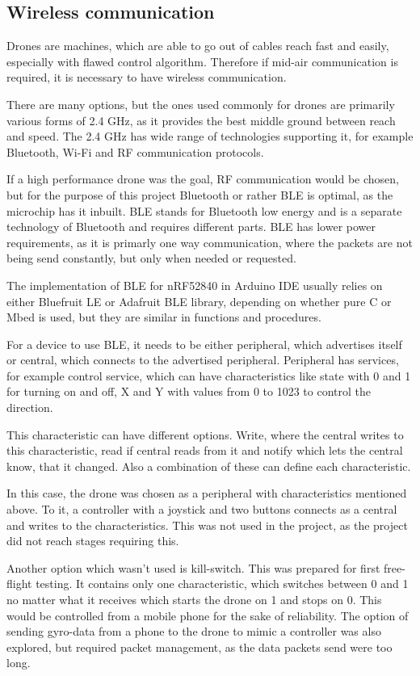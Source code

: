 \subsection{Wireless communication}
Drones are machines, which are able to go out of cables reach fast and easily, especially with flawed control algorithm. Therefore if mid-air communication is required, it is necessary to have wireless communication.

There are many options, but the ones used commonly for drones are primarily various forms of 2.4 GHz, as it provides the best middle ground between reach and speed. The 2.4 GHz has wide range of technologies supporting it, for example Bluetooth, Wi-Fi and RF communication protocols. 

If a high performance drone was the goal, RF communication would be chosen, but for the purpose of this project Bluetooth or rather BLE is optimal, as the microchip has it inbuilt. BLE stands for Bluetooth low energy and is a separate technology of Bluetooth and requires different parts. BLE has lower power requirements, as it is primarly one way communication, where the packets are not being send constantly, but only when needed or requested.

The implementation of BLE for nRF52840 in Arduino IDE usually relies on either Bluefruit LE or Adafruit BLE library, depending on whether pure C or Mbed is used, but they are similar in functions and procedures.

For a device to use BLE, it needs to be either peripheral, which advertises itself or central, which connects to the advertised peripheral. Peripheral has services, for example control service, which can have characteristics like state with 0 and 1 for turning on and off, X and Y with values from 0 to 1023 to control the direction.

This characteristic can have different options. Write, where the central writes to this characteristic, read if central reads from it and notify which lets the central know, that it changed. Also a combination of these can define each characteristic.

In this case, the drone was chosen as a peripheral with characteristics mentioned above. To it, a controller with a joystick and two buttons connects as a central and writes to the characteristics. This was not used in the project, as the project did not reach stages requiring this.

Another option which wasn't used is kill-switch. This was prepared for first free-flight testing. It contains only one characteristic, which switches between 0 and 1 no matter what it receives which starts the drone on 1 and stops on 0. This would be controlled from a mobile phone for the sake of reliability. The option of sending gyro-data from a phone to the drone to mimic a controller was also explored, but required packet management, as the data packets send were too long.

